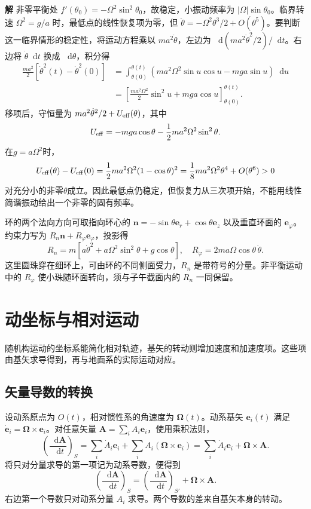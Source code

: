 \documentclass[11pt,openany,fontset=fandol]{ctexbook}
\theoremstyle{definition}\newtheorem{example}{例}[chapter]\newtheorem{exercise}{习题}[chapter]
\newcommand{\SolutionStart}{\par\medskip\ifdim\pagetotal>0pt\ifdim\dimexpr\pagegoal-\pagetotal\relax<3\baselineskip\newpage\fi\fi\noindent\textbf{解}\quad\ignorespaces}
\newenvironment{solution}{\SolutionStart}{\par\medskip}
\newcommand{\dd}{\mathop{}\!\mathrm d}\newcommand{\ee}{\mathrm e}\newcommand{\vct}[1]{\bm{#1}}
\begin{document}
\begin{solution}
非零平衡处 $f'(\theta_0)=-\Omega^2\sin^2\theta_0$，故稳定，小振动频率为 $|\Omega|\sin\theta_0$。临界转速 $\Omega^2=g/a$ 时，最低点的线性恢复项为零，但
$\ddot\theta=-\Omega^2\theta^3/2+O(\theta^5)$。要判断这一临界情形的稳定性，将运动方程乘以 $ma^2\dot\theta$，左边为 $\dd(ma^2\dot\theta^2/2)/\dd t$。右边将 $\dot\theta\dd t$ 换成 $\dd\theta$，积分得
\[
\begin{aligned}
\frac{ma^2}{2}[\dot\theta^2(t)-\dot\theta^2(0)]
&=\int_{\theta(0)}^{\theta(t)}
(ma^2\Omega^2\sin u\cos u-mga\sin u)\dd u\\
&=\left[\frac{ma^2\Omega^2}{2}\sin^2u+mga\cos u\right]_{\theta(0)}^{\theta(t)}.
\end{aligned}
\]
移项后，守恒量为 $ma^2\dot\theta^2/2+U_{\rm eff}(\theta)$，其中
\[
U_{\rm eff}=-mga\cos\theta-\frac12ma^2\Omega^2\sin^2\theta.
\]
在$g=a\Omega^2$时，
\[
U_{\rm eff}(\theta)-U_{\rm eff}(0)
=\frac12ma^2\Omega^2(1-\cos\theta)^2
=\frac18ma^2\Omega^2\theta^4+O(\theta^6)>0
\]
对充分小的非零$\theta$成立。因此最低点仍稳定，但恢复力从三次项开始，不能用线性简谐振动给出一个非零的固有频率。

环的两个法向方向可取指向环心的
$\vct n=-\sin\theta\vct e_r+\cos\theta\vct e_z$
以及垂直环面的 $\vct e_\varphi$。约束力写为 $R_n\vct n+R_\varphi\vct e_\varphi$，投影得
\[
R_n=m[a\dot\theta^2+a\Omega^2\sin^2\theta+g\cos\theta],
\quad R_\varphi=2ma\Omega\cos\theta\,\dot\theta.
\]
这里圆珠穿在细环上，可由环的不同侧面受力，$R_n$ 是带符号的分量。非平衡运动中的 $R_\varphi$ 使小珠随环面转向，须与子午截面内的 $R_n$ 一同保留。

\end{solution}

\section{动坐标与相对运动}
随机构运动的坐标系能简化相对轨迹，基矢的转动则增加速度和加速度项。这些项由基矢求导得到，再与地面系的实际运动对应。

\subsection{矢量导数的转换}
设动系原点为 $O(t)$，相对惯性系的角速度为 $\vct\Omega(t)$。动系基矢 $\vct e_i(t)$ 满足 $\dot{\vct e}_i=\vct\Omega\times\vct e_i$。对任意矢量 $\vct A=\sum_i A_i\vct e_i$，使用乘积法则，
\[
\left(\frac{\dd\vct A}{\dd t}\right)_{\!S}
=\sum_i\dot A_i\vct e_i+\sum_iA_i(\vct\Omega\times\vct e_i)
=\sum_i\dot A_i\vct e_i+\vct\Omega\times\vct A.
\]
将只对分量求导的第一项记为动系导数，便得到
\begin{equation}\label{mp3:eq:l3-transport}
\left(\frac{\dd\vct A}{\dd t}\right)_{\!S}
=\left(\frac{\dd\vct A}{\dd t}\right)_{\!S'}
+\vct\Omega\times\vct A.
\end{equation}
右边第一个导数只对动系分量 $A_i$ 求导。两个导数的差来自基矢本身的转动。
\end{document}
